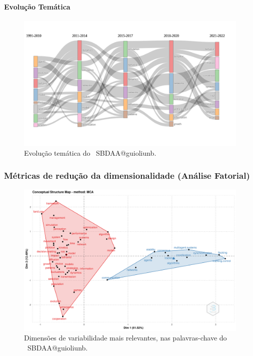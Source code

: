 \paragraph{Evolução Temática}

\begin{figure}
    \centering
    \includegraphics[width=1\textwidth]{experiments/jhcf/PesqBibliogr/SimulacaoMultiagente/WoS-20220203/Estrutura/Conceitual/MASSA2-Thematic-Evolution.png}
    \caption{Evolução temática do  \dataset\ SBDAA@guioliunb.}
    \label{fig:MASSA2-ThematicMap}
\end{figure}

\subsubsection{Métricas de redução da dimensionalidade (Análise Fatorial)}

\begin{figure}
    \centering
    \includegraphics[width=1\textwidth]{experiments/jhcf/PesqBibliogr/SimulacaoMultiagente/WoS-20220203/Estrutura/Conceitual/MASSA2-FactorialAnalysis-MCA-FactorialMap.png}
    \caption{Dimensões de variabilidade mais relevantes, nas palavras-chave do  \dataset\ SBDAA@guioliunb.}
    \label{fig:MASSA2-FactorialAnalysis-MCA-FactorialMap}
\end{figure}


